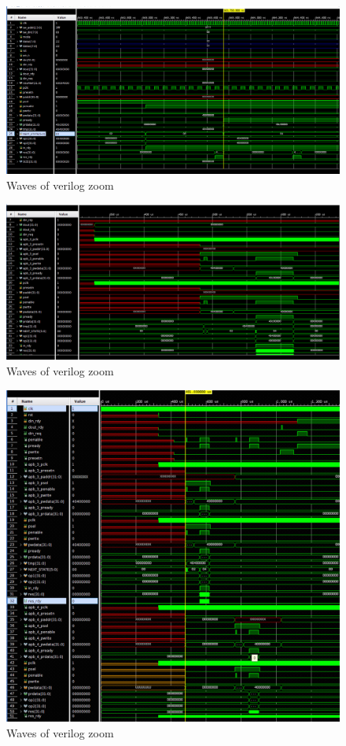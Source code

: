 \documentclass[]{IEEEtran}
\begin{document}
\begin{figure}[tb]
	\centering
	\includegraphics[scale=0.33]{figures/verilog-zoom.png}
	\caption{Waves of verilog zoom}
	\label{fig:verilogzoom}
\end{figure}


\begin{figure}[tb]
	\centering
	\includegraphics[scale=0.33]{figures/verilog-binding.png}
	\caption{Waves of verilog zoom}
	\label{fig:verilogbinding}
\end{figure}


\begin{figure}[tb]
	\centering
	\includegraphics[scale=0.50]{figures/longwave.png}
	\caption{Waves of verilog zoom}
	\label{fig:longsimulation}
\end{figure}

	
	
\end{document}
